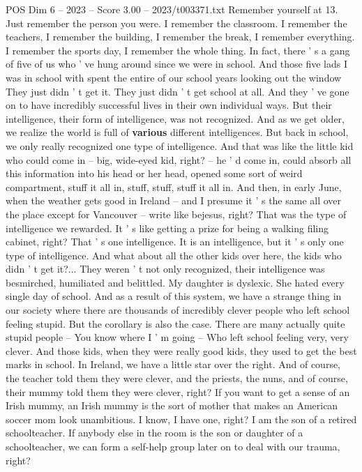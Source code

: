 \begin{textsample}{POS Dim 6 – 2023 – Score 3.00 – 2023/t003371.txt}
Remember yourself at 13.
Just remember the person you were.
I remember the classroom.
I remember the teachers, I remember the building, I remember the break, I remember everything.
I remember the sports day, I remember the whole thing.
In fact, there ' s a gang of five of us who ' ve hung around since we were in school.
And those five lads I was in school with spent the entire of our school years looking out the window They just didn ' t get it.
They just didn ' t get school at all.
And they ' ve gone on to have incredibly successful lives in their own individual ways.
But their intelligence, their form of intelligence, was not recognized.
And as we get older, we realize the world is full of \textbf{various} different intelligences.
But back in school, we only really recognized one type of intelligence.
And that was like the little kid who could come in -- big, wide-eyed kid, right? -- he ' d come in, could absorb all this information into his head or her head, opened some sort of weird compartment, stuff it all in, stuff, stuff, stuff it all in.
And then, in early June, when the weather gets good in Ireland -- and I presume it ' s the same all over the place except for Vancouver -- write like bejesus, right?
That was the type of intelligence we rewarded.
It ' s like getting a prize for being a walking filing cabinet, right?
That ' s one intelligence.
It is an intelligence, but it ' s only one type of intelligence.
And what about all the other kids over here, the kids who didn ' t get it?...
They weren ' t not only recognized, their intelligence was besmirched, humiliated and belittled.
My daughter is dyslexic.
She hated every single day of school.
And as a result of this system, we have a strange thing in our society where there are thousands of incredibly clever people who left school feeling stupid.
But the corollary is also the case.
There are many actually quite stupid people -- You know where I ' m going -- Who left school feeling very, very clever.
And those kids, when they were really good kids, they used to get the best marks in school.
In Ireland, we have a little star over the right.
And of course, the teacher told them they were clever, and the priests, the nuns, and of course, their mummy told them they were clever, right?
If you want to get a sense of an Irish mummy, an Irish mummy is the sort of mother that makes an American soccer mom look unambitious.
I know, I have one, right?
I am the son of a retired schoolteacher.
If anybody else in the room is the son or daughter of a schoolteacher, we can form a self-help group later on to deal with our trauma, right?

\end{textsample}
